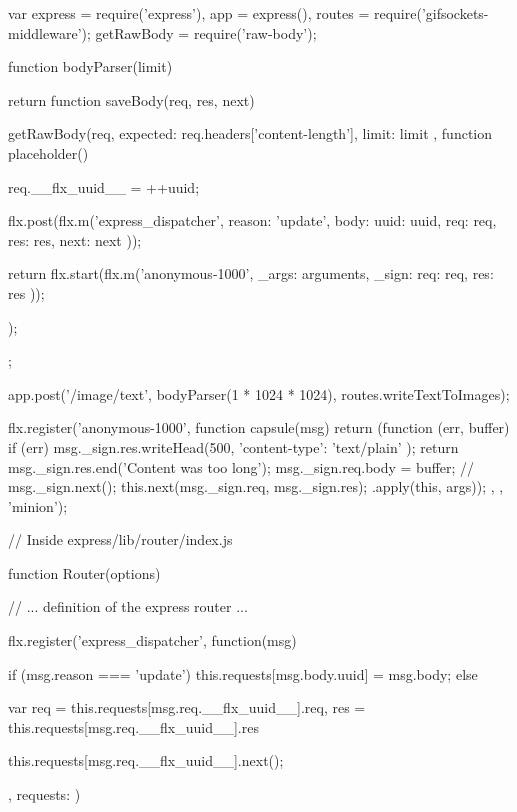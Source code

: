 \appendix

\begin{code}[js, caption={Simplified version of gifsockets-server},label={lst:gifsocket}]
var express = require('express'),
    app = express(),
    routes = require('gifsockets-middleware');
    getRawBody = require('raw-body');

function bodyParser(limit) {
  return function saveBody(req, res, next) {
    getRawBody(req, {
      expected: req.headers['content-length'],
      limit: limit
    },  function placeholder() {
          req.__flx_uuid__ = ++uuid;

          flx.post(flx.m('express_dispatcher', {
            reason: 'update',
            body: {
              uuid: uuid,
              req: req,
              res: res,
              next: next
            }
          }));

          return flx.start(flx.m('anonymous-1000', {
            _args: arguments,
            _sign: {
              req: req,
              res: res
            }
          }));
        });
  };
}

app.post('/image/text', bodyParser(1 * 1024 * 1024), routes.writeTextToImages);

flx.register('anonymous-1000', function capsule(msg) {
  return (function (err, buffer) {
    if (err) {
      msg._sign.res.writeHead(500, { 'content-type': 'text/plain' });
      return msg._sign.res.end('Content was too long');
    }
    msg._sign.req.body = buffer;
    // msg._sign.next();
    this.next(msg._sign.req, msg._sign.res);
  }.apply(this, args));
}, {}, 'minion');
\end{code}

\begin{code}[js, caption={Simplified modifications on the express router},label={lst:gifsocket}]

// Inside express/lib/router/index.js

function Router(options) {

// ... definition of the express router ...

  flx.register('express_dispatcher', function(msg) {
    if (msg.reason === 'update') {
      this.requests[msg.body.uuid] = msg.body;
    } else {
      var req = this.requests[msg.req.__flx_uuid__].req,
          res = this.requests[msg.req.__flx_uuid__].res

      this.requests[msg.req.__flx_uuid__].next();
    }
  }, {
    requests: {}
  })
}

\end{code}